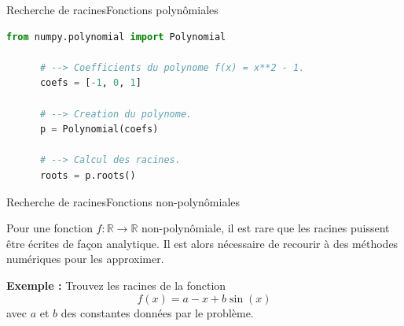 \documentclass[usenames,dvipsnames,svgnames,10pt,aspectratio=169]{beamer}
\begin{document}
\begin{frame}[t, c, fragile]{Recherche de racines}{Fonctions polynômiales}
  \begin{minipage}{.68\textwidth}
    \begin{lstlisting}[language=Python]
      from numpy.polynomial import Polynomial

      # --> Coefficients du polynome f(x) = x**2 - 1.
      coefs = [-1, 0, 1]

      # --> Creation du polynome.
      p = Polynomial(coefs)

      # --> Calcul des racines.
      roots = p.roots()
    \end{lstlisting}
  \end{minipage}%
  \hfill
  \begin{minipage}{.28\textwidth}
    \centering
  \end{minipage}

  \vspace{1cm}
\end{frame}

\begin{frame}[t, c]{Recherche de racines}{Fonctions non-polynômiales}
  \begin{minipage}{.68\textwidth}
    Pour une fonction $f : \mathbb{R} \to \mathbb{R}$ non-polynômiale, il est rare que les racines puissent être écrites de façon analytique.
    Il est alors nécessaire de recourir à des méthodes numériques pour les approximer.

    \bigskip

    \textbf{Exemple :} Trouvez les racines de la fonction
    \[
    f(x) = a - x + b \sin(x)
    \]
    avec $a$ et $b$ des constantes données par le problème.
  \end{minipage}%
  \hfill
  \begin{minipage}{.28\textwidth}
    \centering
  \end{minipage}

\end{frame}
\end{document}
